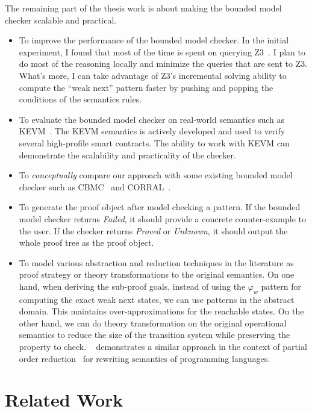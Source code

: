 \documentclass{almostllncs}
\begin{document}
The remaining part of the thesis work is about making the bounded model checker scalable and practical.

\begin{itemize}
\item To improve the performance of the bounded model checker.
In the initial experiment, I found that most of the time is spent on querying Z3~\cite{DBLP:conf/tacas/MouraB08}.
I plan to do most of the reasoning locally and minimize the queries that are sent to Z3.
What's more, I can take advantage of Z3's incremental solving ability to compute the ``weak next'' pattern faster by pushing and popping the conditions of the semantics rules.
\item To evaluate the bounded model checker on real-world semantics such as KEVM~\cite{KEVM}.
The KEVM semantics is actively developed and used to verify several high-profile smart contracts.
The ability to work with KEVM can demonstrate the scalability and practicality of the checker.
\item To \emph{conceptually} compare our approach with some existing bounded model checker such as CBMC~\cite{Clarke2004ATF} and CORRAL~\cite{corral-a-solver-for-reachability-modulo-theories-2}.
\item To generate the proof object after model checking a pattern.
If the bounded model checker returns \emph{Failed}, it should provide a concrete counter-example to the user.
If the checker returns \emph{Proved} or \emph{Unknown}, it should output the whole proof tree as the proof object.
\item To model various abstraction and reduction techniques in the literature as proof strategy or theory transformations to the original semantics.
On one hand, when deriving the sub-proof goals, instead of using the $\varphi_w$ pattern for computing the exact weak next states, we can use patterns in the abstract domain.
This maintains over-approximations for the reachable states.
On the other hand, we can do theory transformation on the original operational semantics to reduce the size of the transition system while preserving the property to check.
~\cite{MaudePOR} demonstrates a similar approach in the context of partial order reduction~\cite{Alur:2001:PRS:375503.375505,Flanagan:2005:DPR:1040305.1040315} for rewriting semantics of programming languages.

\end{itemize}


\section{Related Work}
\end{document}
